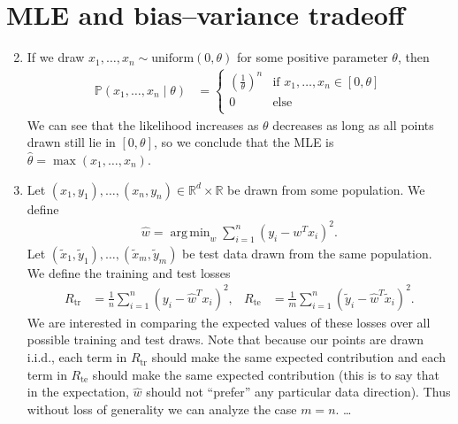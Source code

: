 \documentclass[11pt,letterpaper]{article}
\DeclareMathOperator*{\argmin}{arg\,min}
\numberwithin{equation}{section}
\numberwithin{figure}{section}
\begin{document}
\section{MLE and bias--variance tradeoff}

\begin{enumerate}[label=\arabic*.]
	\setcounter{enumi}{1}
	\item If we draw $x_1,\ldots,x_n \sim \text{uniform}(0,\theta)$ for some positive parameter $\theta$, then
	\begin{align*}
		\mathbb{P}(x_1,\ldots,x_n \mid \theta) &= \left\{\begin{array}{ll}
			\left(\frac{1}{\theta}\right)^n & \text{if } x_1,\ldots,x_n \in [0,\theta]\\
			0 & \text{else}\\
			\end{array}\right.
	\end{align*}
	We can see that the likelihood increases as $\theta$ decreases as long as all points drawn still lie in $[0,\theta]$, so we conclude that the MLE is $\hat{\theta} = \max(x_1,\ldots,x_n)$.




	\item Let $(x_1,y_1),\ldots,(x_n,y_n) \in \mathbb{R}^d \times \mathbb{R}$ be drawn from some population. We define
	\begin{align*}
	\hat{w} = \argmin_{w} \sum_{i=1}^n (y_i - w^T x_i)^2.
	\end{align*}
	Let $(\tilde{x}_1,\tilde{y}_1),\ldots,(\tilde{x}_m,\tilde{y}_m)$ be test data drawn from the same population. We define the training and test losses
	\begin{align*}
		R_\mathrm{tr} &= \frac{1}{n} \sum_{i=1}^n \left(y_i - \hat{w}^T x_i\right)^2,&
		R_\mathrm{te} &= \frac{1}{m} \sum_{i=1}^n \left(\tilde{y}_i - \hat{w}^T \tilde{x}_i\right)^2.
	\end{align*}
	We are interested in comparing the expected values of these losses over all possible training and test draws. Note that because our points are drawn i.i.d., each term in $R_\mathrm{tr}$ should make the same expected contribution and each term in $R_\mathrm{te}$ should make the same expected contribution (this is to say that in the expectation, $\hat{w}$ should not ``prefer'' any particular data direction). Thus without loss of generality we can analyze the case $m=n$. \ldots
\end{enumerate}
\end{document}
